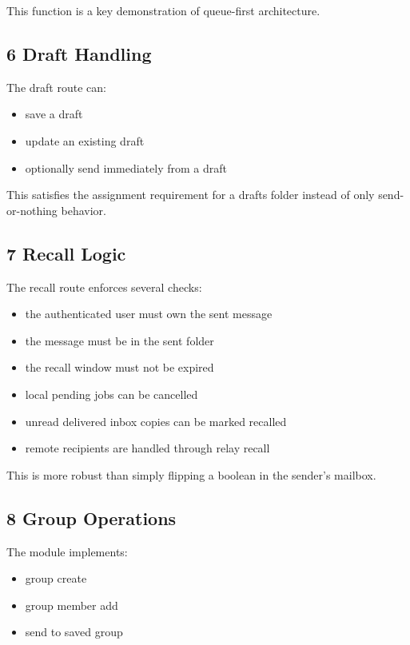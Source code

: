 \documentclass[11pt,a4paper]{article}
\begin{document}
This function is a key demonstration of queue-first architecture.

\subsection{6 Draft Handling}

The draft route can:

\begin{itemize}
\item save a draft
\item update an existing draft
\item optionally send immediately from a draft
\end{itemize}

This satisfies the assignment requirement for a drafts folder instead of only send-or-nothing behavior.

\subsection{7 Recall Logic}

The recall route enforces several checks:

\begin{itemize}
\item the authenticated user must own the sent message
\item the message must be in the sent folder
\item the recall window must not be expired
\item local pending jobs can be cancelled
\item unread delivered inbox copies can be marked recalled
\item remote recipients are handled through relay recall
\end{itemize}

This is more robust than simply flipping a boolean in the sender's mailbox.

\subsection{8 Group Operations}

The module implements:

\begin{itemize}
\item group create
\item group member add
\item send to saved group
\end{itemize}
\end{document}
